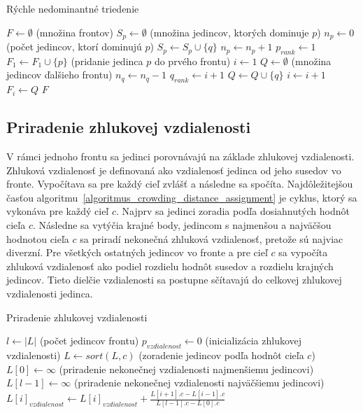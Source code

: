 \vspace*{\dimexpr0.5\baselineskip\relax}
\begin{algorithm}[h]\label{algoritmus_non_dominated_sorting}
\caption{Rýchle nedominantné triedenie}
  $F \gets \emptyset$ (množina frontov)\;
   {
    $S_p \gets \emptyset$ (množina jedincov, ktorých dominuje $p$)\;
    $n_p \gets 0$ (počet jedincov, ktorí dominujú $p$)\;
     {
       {
        $S_p \gets S_p \cup \{q\}$\;
      }
       {
        $n_p \gets n_p + 1$\;
      }
    }
     {
      $p_{rank} \gets 1$\;
      $F_1 \gets F_1 \cup \{p\}$ (pridanie jedinca $p$ do prvého frontu)\;
    }
  }
  $i \gets 1$\;
   {
    $Q \gets \emptyset$ (množina jedincov ďalšieho frontu)\;
     {
       {
        $n_q \gets n_q - 1$\;
         {
          $q_{rank} \gets i + 1$\;
          $Q \gets Q \cup \{q\}$\;
        }
      }
    }
    $i \gets i + 1$\;
    $F_i \gets Q$\;
  }
  \Return $F$\;
\end{algorithm}

\subsection*{Priradenie zhlukovej vzdialenosti}
V rámci jednoho frontu sa jedinci porovnávajú na základe zhlukovej vzdialenosti.
Zhluková vzdialenosť je definovaná ako vzdialenosť jedinca od jeho susedov vo fronte.
Vypočítava sa pre každý cieľ zvlášť a následne sa spočíta.
Najdôležitejšou časťou algoritmu~\ref{algoritmus_crowding_distance_assignment} je cyklus, ktorý sa vykonáva pre každý cieľ $c$.
Najprv sa jedinci zoradia podľa dosiahnutých hodnôt cieľa $c$.
Následne sa vytýčia krajné body, jedincom s najmenšou a najväčšou hodnotou cieľa $c$ sa priradí nekonečná zhluková vzdialenosť, pretože sú najviac diverzní.
Pre všetkých ostatných jedincov vo fronte a pre cieľ $c$ sa vypočíta zhluková vzdialenosť ako podiel rozdielu hodnôt susedov a rozdielu krajných jedincov.
Tieto dielčie vzdialenosti sa postupne sčítavajú do celkovej zhlukovej vzdialenosti jedinca.

\vspace*{\dimexpr0.5\baselineskip\relax}
\begin{algorithm}[h]\label{algoritmus_crowding_distance_assignment}
\caption{Priradenie zhlukovej vzdialenosti}
  $l \gets |L|$ (počet jedincov frontu)\;
   {
    $p_{vzdialenost} \gets 0$ (inicializácia zhlukovej vzdialenosti)\;
  }
   {
    $L \gets sort(L, c)$ (zoradenie jedincov podľa hodnôt cieľa $c$)\;
    $L[0] \gets \infty$ (priradenie nekonečnej vzdialenosti najmenšiemu jedincovi)\;
    $L[l-1] \gets \infty$ (priradenie nekonečnej vzdialenosti najväčšiemu jedincovi)\;
     {
      $L[i]_{vzdialenost} \gets L[i]_{vzdialenost} + \frac{L[i+1].c - L[i-1].c}{L[l-1].c - L[0].c}$\;
    }
  }
\end{algorithm}

